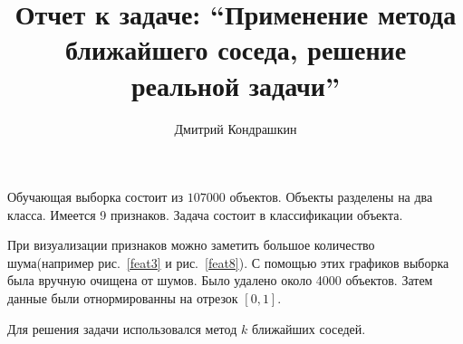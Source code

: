 \documentclass[8pt, a4paper]{article}
\begin{document}
\author{Дмитрий Кондрашкин}
\title{Отчет к задаче: ``Применение метода ближайшего соседа, решение реальной задачи''}
\maketitle

%
%
%
%
%
%
%
%
%
%
%

Обучающая выборка состоит из $107000$ объектов. Объекты разделены на два класса. Имеется
9 признаков. Задача состоит в классификации объекта.

При визуализации признаков можно заметить большое количество шума(например рис.~\ref{feat3} и рис.~\ref{feat8}).
С помощью этих графиков выборка была вручную очищена от шумов. Было удалено около 4000 объектов.
Затем данные были отнормированны на отрезок $[0,1]$.

Для решения задачи использовался метод $k$ ближайших соседей.
\end{document}

